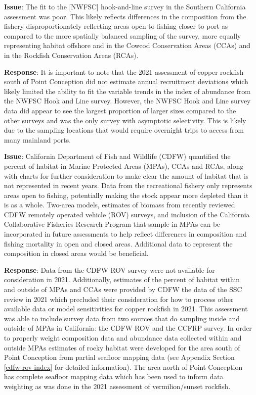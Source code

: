 \documentclass[11pt,
  english,
  letterpaper,
]{article}
\begin{document}
\textbf{Issue}: The fit to the {[}NWFSC{]} hook-and-line survey in the Southern California assessment was poor. This likely reflects differences in the composition from the fishery disproportionately reflecting areas open to fishing closer to port as compared to the more spatially balanced sampling of the survey, more equally representing habitat offshore and in the Cowcod Conservation Areas (CCAs) and in the Rockfish Conservation Areas (RCAs).

\textbf{Response}: It is important to note that the 2021 assessment of copper rockfish south of Point Conception did not estimate annual recruitment deviations which likely limited the ability to fit the variable trends in the index of abundance from the NWFSC Hook and Line survey. However, the NWFSC Hook and Line survey data did appear to see the largest proportion of larger sizes compared to the other surveys and was the only survey with asymptotic selectivity. This is likely due to the sampling locations that would require overnight trips to access from many mainland ports.

\textbf{Issue}: California Department of Fish and Wildlife (CDFW) quantified the percent of habitat in Marine Protected Areas (MPAs), CCAs and RCAs, along with charts for further consideration to make clear the amount of habitat that is not represented in recent years. Data from the recreational fishery only represents areas open to fishing, potentially making the stock appear more depleted than it is as a whole. Two-area models, estimates of biomass from recently reviewed CDFW remotely operated vehicle (ROV) surveys, and inclusion of the California Collaborative Fisheries Research Program that sample in MPAs can be incorporated in future assessments to help reflect differences in composition and fishing mortality in open and closed areas. Additional data to represent the composition in closed areas would be beneficial.

\textbf{Response}: Data from the CDFW ROV survey were not available for consideration in 2021. Additionally, estimates of the percent of habitat within and outside of MPAs and CCAs were provided by CDFW the data of the SSC review in 2021 which precluded their consideration for how to process other available data or model sensitivities for copper rockfish in 2021. This assessment was able to include survey data from two sources that do sampling inside and outside of MPAs in California: the CDFW ROV and the CCFRP survey. In order to properly weight composition data and abundance data collected within and outside MPAs estimates of rocky habitat were developed for the area south of Point Conception from partial seafloor mapping data (see Appendix Section \ref{cdfw-rov-index} for detailed information). The area north of Point Conception has complete seafloor mapping data which has been used to inform data weighting as was done in the 2021 assessment of vermilion/sunset rockfish.
\end{document}
